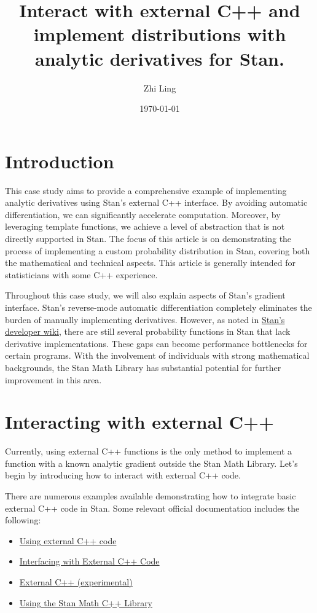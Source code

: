 \documentclass[11pt]{article}
\title{Interact with external C++ and implement distributions with analytic derivatives for Stan.}
\author{Zhi Ling}
\date{\today}
\begin{document}
\maketitle


\section{Introduction}


This case study aims to provide a comprehensive example of implementing analytic derivatives using Stan's external C++ interface. By avoiding automatic differentiation, we can significantly accelerate computation. Moreover, by leveraging template functions, we achieve a level of abstraction that is not directly supported in Stan. The focus of this article is on demonstrating the process of implementing a custom probability distribution in Stan, covering both the mathematical and technical aspects. This article is generally intended for statisticians with some C++ experience.

Throughout this case study, we will also explain aspects of Stan's gradient interface. Stan's reverse-mode automatic differentiation completely eliminates the burden of manually implementing derivatives. However, as noted in \href{https://github.com/stan-dev/stan/wiki/Contributing-to-Stan-Without-C-Plus-Plus--Experience}{Stan's developer wiki}, there are still several probability functions in Stan that lack derivative implementations. These gaps can become performance bottlenecks for certain programs. With the involvement of individuals with strong mathematical backgrounds, the Stan Math Library has substantial potential for further improvement in this area.




\section{Interacting with external C++}

Currently, using external C++ functions is the only method to implement a function with a known analytic gradient outside the Stan Math Library. Let's begin by introducing how to interact with external C++ code.

There are numerous examples available demonstrating how to integrate basic external C++ code in Stan. Some relevant official documentation includes the following:

\begin{itemize}
    \item \href{https://mc-stan.org/docs/cmdstan-guide/using-external-cpp-code.html}{Using external C++ code}
    \item \href{https://mc-stan.org/rstan/articles/external.html}{Interfacing with External C++ Code}
    \item \href{https://pystan2.readthedocs.io/en/latest/external_cpp.html}{External C++ (experimental)}
    \item \href{https://cran.r-project.org/web/packages/StanHeaders/vignettes/stanmath.html}{Using the Stan Math C++ Library}
\end{itemize}
\end{document}
